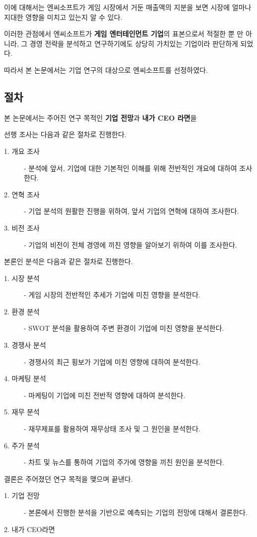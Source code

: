 \documentclass[11pt]{oblivoir}
\begin{document}
			이에 대해서는 엔씨소프트가 게임 시장에서 거둔 매출액의 지분을 보면 시장에 얼마나 지대한 영향을 미치고 있는지 알 수 있다.
			
			이러한 관점에서 엔씨소프트가 \textbf{게임 엔터테인먼트 기업}의 표본으로서 적절한 뿐 만 아니라, 그 경영 전략을 분석하고 연구하기에도 상당히 가치있는 기업이라 판단하게 되었다. 
			
			따라서 본 논문에서는 기업 연구의 대상으로 엔씨소프트를 선정하였다.
						
		\subsection{절차}
			본 논문에서는 주어진 연구 목적인 \textbf{기업 전망}과 \textbf{내가 CEO 라면}을 
		
			\noindent 선행 조사는 다음과 같은 절차로 진행한다.
			\begin{description}
				\item[1. 개요 조사] - 분석에 앞서, 기업에 대한 기본적인 이해를 위해 전반적인 개요에 대하여 조사한다.
				\item[2. 연혁 조사] - 기업 분석의 원활한 진행을 위하여, 앞서 기업의 연혁에 대하여 조사한다.
				\item[3. 비전 조사] - 기업의 비전이 전체 경영에 끼친 영향을 알아보기 위하여 이를 조사한다.
			\end{description}
			본론인 분석은 다음과 같은 절차로 진행한다.
			\begin{description}
				\item[1. 시장 분석] - 게임 시장의 전반적인 추세가 기업에 미친 영향을 분석한다.
				\item[2. 환경 분석] - SWOT 분석을 활용하여 주변 환경이 기업에 미친 영향을 분석한다. 
				\item[3. 경쟁사 분석] - 경쟁사의 최근 횡보가 기업에 미친 영향에 대하여 분석한다.
				\item[4. 마케팅 분석] - 마케팅이 기업에 미친 전반적 영향에 대하여 분석한다.
				\item[5. 재무 분석] - 재무제표를 활용하여 재무상태 조사 및 그 원인을 분석한다.
				\item[6. 주가 분석] - 차트 및 뉴스를 통하여 기업의 주가에 영향을 끼친 원인을 분석한다.
			\end{description}
			결론은 주어졌던 연구 목적을 맺으며 끝낸다.
			\begin{description}
				\item[1. 기업 전망] - 본론에서 진행한 분석을 기반으로 예측되는 기업의 전망에 대해서 결론한다.
				\item[2. 내가 CEO라면]
			\end{description}
	
\end{document}
